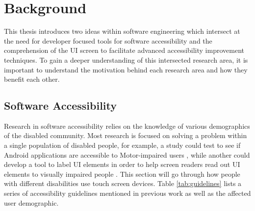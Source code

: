\section{Background}
\label{sec:background}

This thesis introduces two ideas within software engineering which intersect at the need for developer focused tools for software accessibility and the comprehension of the UI screen to facilitate advanced accessibility improvement techniques. To gain a deeper understanding of this intersected research area, it is important to understand the motivation behind each research area and how they benefit each other. 

\subsection{Software Accessibility}

Research in software accessibility relies on the knowledge of various demographics of the disabled community. Most research is focused on solving a problem within a single population of disabled people, for example, a study could test to see if Android applications are accessible to Motor-impaired users \cite{9}, while another could develop a tool to label UI elements in order to help screen readers read out UI elements to visually impaired people \cite{17}. This section will go through how people with different disabilities use touch screen devices. Table \ref{tab:guidelines} lists a series of accessibility guidelines mentioned in previous work as well as the affected user demographic.



